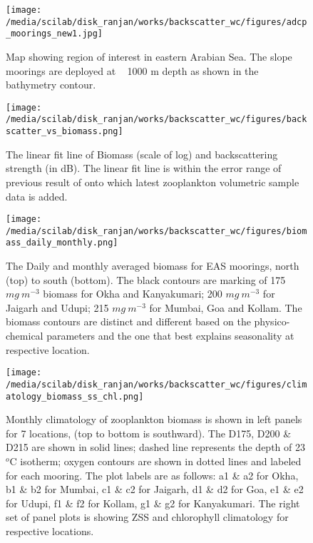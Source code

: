 \documentclass{article}
\begin{document}
\newpage
\begin{figure}[htbp]
	\centering
	\texttt{[image: /media/scilab/disk\_ranjan/works/backscatter\_wc/figures/adcp\_moorings\_new1.jpg]} 
	\captionsetup{justification=justified,font=footnotesize,skip=0.05\baselineskip,width=0.4\textwidth}
	\caption{Map showing region of interest in eastern Arabian Sea. The slope moorings are deployed at ~ 1000 m depth as shown in the bathymetry contour.}
	\label{fig:fig1}
\end{figure}

\newpage
\begin{figure}[htbp]
	\centering
	\texttt{[image: /media/scilab/disk\_ranjan/works/backscatter\_wc/figures/backscatter\_vs\_biomass.png]} 
	\captionsetup{justification=justified,font=footnotesize,skip=0.05\baselineskip,width=0.7\textwidth}
	\caption{The linear fit line of Biomass (scale of log) and backscattering strength (in dB). The linear fit line is within the error range of previous result of \citep{aparna2022seasonal} onto which latest zooplankton volumetric sample data is added.}
	\label{fig:fig2}
\end{figure}


\newpage


\begin{figure}[htbp]
	\centering
	\texttt{[image: /media/scilab/disk\_ranjan/works/backscatter\_wc/figures/biomass\_daily\_monthly.png]} 
	\captionsetup{justification=justified,font=footnotesize,skip=0.05\baselineskip,width=\textwidth}
	\caption{The Daily and monthly averaged biomass for EAS moorings, north (top) to south (bottom). The black contours are marking of 175 $mg\ m^{-3}$ biomass for Okha and Kanyakumari; 200 $mg\ m^{-3}$ for Jaigarh and Udupi; 215 $mg\ m^{-3}$  for Mumbai, Goa and Kollam. The biomass contours are distinct and different based on the physico-chemical parameters and the one that best explains seasonality at respective location.}
	\label{fig:fig3}
\end{figure}

\begin{figure}[htbp]
	\centering
	\texttt{[image: /media/scilab/disk\_ranjan/works/backscatter\_wc/figures/climatology\_biomass\_ss\_chl.png]} 
	\captionsetup{justification=justified,font=footnotesize,skip=0.05\baselineskip,width=\textwidth}
	\caption{Monthly climatology of zooplankton biomass is shown in left panels for 7 locations, (top to bottom is southward). The D175, D200 \& D215 are shown in solid lines; dashed line represents the depth of 23 $^o$C isotherm; oxygen contours are shown in dotted lines and labeled for each mooring. The plot labels are as follows: a1 \& a2 for Okha, b1 \& b2 for Mumbai, c1 \& c2 for Jaigarh, d1 \& d2 for Goa, e1 \& e2 for Udupi, f1 \& f2 for Kollam, g1 \& g2 for Kanyakumari. The right set of panel plots is showing ZSS and chlorophyll climatology for respective locations.}
	\label{fig:fig4}
\end{figure}
\end{document}
